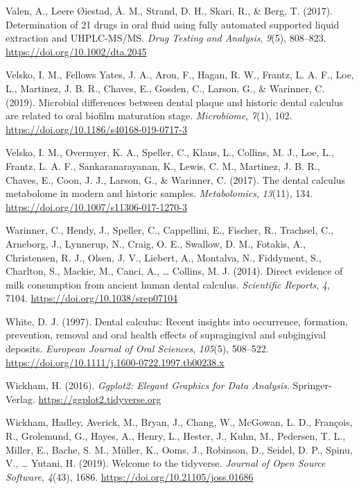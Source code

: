 \documentclass[
  letterpaper,
]{book}
\newlength{\cslhangindent}
\newlength{\cslentryspacingunit} %
\newenvironment{CSLReferences}[2] %
 {%
  \setlength{\parindent}{0pt}
  \ifodd #1
  \let\oldpar\par
  \def\par{\hangindent=\cslhangindent\oldpar}
  \fi
  \setlength{\parskip}{#2\cslentryspacingunit}
 }%
 {}
\begin{document}
\begin{CSLReferences}{1}{0}
\leavevmode{}%
Valen, A., Leere Øiestad, Å. M., Strand, D. H., Skari, R., \& Berg, T.
(2017). Determination of 21 drugs in oral fluid using fully automated
supported liquid extraction and {UHPLC-MS}/{MS}. \emph{Drug Testing and
Analysis}, \emph{9}(5), 808--823. \url{https://doi.org/10.1002/dta.2045}

\leavevmode{}%
Velsko, I. M., Fellows Yates, J. A., Aron, F., Hagan, R. W., Frantz, L.
A. F., Loe, L., Martinez, J. B. R., Chaves, E., Gosden, C., Larson, G.,
\& Warinner, C. (2019). Microbial differences between dental plaque and
historic dental calculus are related to oral biofilm maturation stage.
\emph{Microbiome}, \emph{7}(1), 102.
\url{https://doi.org/10.1186/s40168-019-0717-3}

\leavevmode{}%
Velsko, I. M., Overmyer, K. A., Speller, C., Klaus, L., Collins, M. J.,
Loe, L., Frantz, L. A. F., Sankaranarayanan, K., Lewis, C. M., Martinez,
J. B. R., Chaves, E., Coon, J. J., Larson, G., \& Warinner, C. (2017).
The dental calculus metabolome in modern and historic samples.
\emph{Metabolomics}, \emph{13}(11), 134.
\url{https://doi.org/10.1007/s11306-017-1270-3}

\leavevmode{}%
Warinner, C., Hendy, J., Speller, C., Cappellini, E., Fischer, R.,
Trachsel, C., Arneborg, J., Lynnerup, N., Craig, O. E., Swallow, D. M.,
Fotakis, A., Christensen, R. J., Olsen, J. V., Liebert, A., Montalva,
N., Fiddyment, S., Charlton, S., Mackie, M., Canci, A., \ldots{}
Collins, M. J. (2014). Direct evidence of milk consumption from ancient
human dental calculus. \emph{Scientific Reports}, \emph{4}, 7104.
\url{https://doi.org/10.1038/srep07104}

\leavevmode{}%
White, D. J. (1997). Dental calculus: Recent insights into occurrence,
formation, prevention, removal and oral health effects of supragingival
and subgingival deposits. \emph{European Journal of Oral Sciences},
\emph{105}(5), 508--522.
\url{https://doi.org/10.1111/j.1600-0722.1997.tb00238.x}

\leavevmode{}%
Wickham, H. (2016). \emph{Ggplot2: {Elegant Graphics} for {Data
Analysis}}. {Springer-Verlag}. \url{https://ggplot2.tidyverse.org}

\leavevmode{}%
Wickham, Hadley, Averick, M., Bryan, J., Chang, W., McGowan, L. D.,
François, R., Grolemund, G., Hayes, A., Henry, L., Hester, J., Kuhn, M.,
Pedersen, T. L., Miller, E., Bache, S. M., Müller, K., Ooms, J.,
Robinson, D., Seidel, D. P., Spinu, V., \ldots{} Yutani, H. (2019).
Welcome to the {tidyverse}. \emph{Journal of Open Source Software},
\emph{4}(43), 1686. \url{https://doi.org/10.21105/joss.01686}


\end{CSLReferences}
\end{document}
